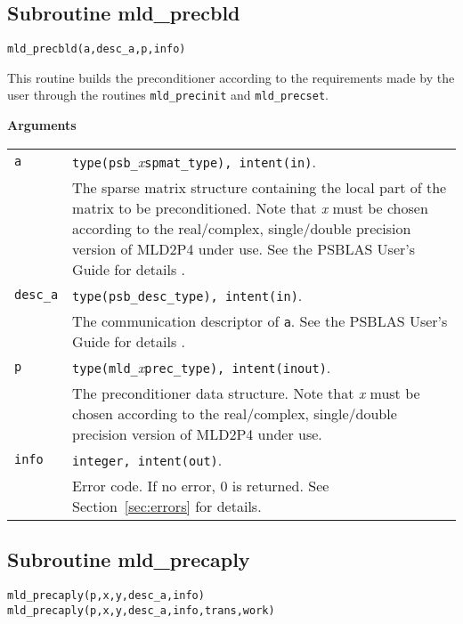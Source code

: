 \subsection{Subroutine mld\_precbld\label{sec:precbld}}

\begin{center}
\verb|mld_precbld(a,desc_a,p,info)|\\
\end{center}

\noindent
This routine builds the preconditioner according to the requirements made by
the user through the routines \verb|mld_precinit| and \verb|mld_precset|.

{\baselineskip\noindent\large\bfseries Arguments}

\begin{tabular}{p{1.2cm}p{12cm}}
\verb|a|      & \verb|type(psb_|\emph{x}\verb|spmat_type), intent(in)|. \\
              & The sparse matrix structure containing the local part of the
                matrix to be preconditioned. Note that \emph{x} must be chosen according
                to the real/complex, 
single/double precision version of MLD2P4 under use.
                See the PSBLAS User's Guide for details \cite{PSBLASGUIDE}.\\
\verb|desc_a| & \verb|type(psb_desc_type), intent(in)|. \\
              & The communication descriptor of \verb|a|. See the PSBLAS User's Guide for
                details \cite{PSBLASGUIDE}.\\
\verb|p|      & \verb|type(mld_|\emph{x}\verb|prec_type), intent(inout)|.\\
              & The preconditioner data structure. Note that \emph{x} must be chosen according
                to the real/complex, single/double precision version of MLD2P4 under use.\\
\verb|info|   & \verb|integer, intent(out)|.\\
              & Error code. If no error, 0 is returned. See Section~\ref{sec:errors} for details.\\
\end{tabular}

\clearpage
\subsection{Subroutine mld\_precaply\label{sec:precaply}}

\begin{center}
\verb|mld_precaply(p,x,y,desc_a,info)|\\
\verb|mld_precaply(p,x,y,desc_a,info,trans,work)|\\
\end{center}

